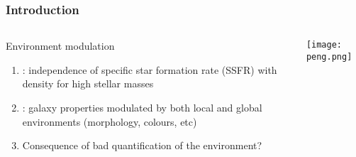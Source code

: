 \begin{frame}
    \frametitle{Introduction}
    \begin{columns}
        \begin{column}{0.7\textwidth}
            \begin{block}{Environment modulation}
                \begin{enumerate}
                    \item<1-> \citet{Peng+10}: independence of specific star
                        formation rate (SSFR) with density for high stellar
                        masses
                    \item<2-> \citet{vonderLinden+10}: galaxy properties
                        modulated by both local and global environments
                        (morphology, colours, etc)
                    \item<3-> Consequence of bad quantification of the
                        environment?
                \end{enumerate}
            \end{block}
        \end{column}
        \begin{column}{0.4\textwidth}
            \begin{minipage}[c][0.6\textheight][c]{\linewidth}
                \centering
                \texttt{[image: peng.png]}
            \end{minipage}
        \end{column}
    \end{columns}
\end{frame}


